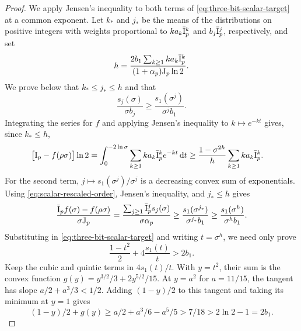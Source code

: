 \begin{proof}
We apply Jensen's inequality to both terms of \eqref{eq:three-bit-scalar-target}
at a common exponent. Let $k_*$ and $j_*$ be the means of the distributions
on positive integers with weights proportional to $k a_k\bar{\mathrm{I}}_p^k$ and $b_j\bar{\mathrm{I}}_p^j$,
respectively, and set
\begin{equation*}
 h=\frac{2b_1\sum_{k\ge1} k a_k\bar{\mathrm{I}}_p^k}{(1+\alpha_p)\mathrm{J}_p\ln2}.
\end{equation*}
We prove below that $k_*\le j_*\le h$ and that
\begin{equation}
 \label{eq:scalar-rescaled-order}
 \frac{s_j(\sigma)}{\sigma b_j}\ge
 \frac{s_1(\sigma^j)}{\sigma^j b_1}.
\end{equation}
Integrating the series for $f$ and applying Jensen's inequality
to $k\mapsto e^{-kt}$ gives, since $k_*\le h$,
\begin{align*}
 \bigl[\mathrm{I}_p-f(\rho\sigma)\bigr]\ln2
 &=\int_0^{-2\ln\sigma}\sum_{k\ge1} k a_k\bar{\mathrm{I}}_p^k e^{-kt}\,\mathrm dt
 \ge \frac{1-\sigma^{2h}}{h}\sum_{k\ge1} k a_k\bar{\mathrm{I}}_p^k .
\end{align*}
For the second term, $j\mapsto s_1(\sigma^j)/\sigma^j$ is a decreasing
convex sum of exponentials. Using \eqref{eq:scalar-rescaled-order},
Jensen's inequality, and $j_*\le h$ gives
\begin{equation*}
 \frac{\bar{\mathrm{I}}_p f(\sigma)-f(\rho\sigma)}{\sigma\mathrm{J}_p}
 =\frac{\sum_{j\ge1}\bar{\mathrm{I}}_p^j s_j(\sigma)}{\sigma\alpha_p}
 \ge \frac{s_1(\sigma^{j_*})}{\sigma^{j_*} b_1}
 \ge \frac{s_1(\sigma^h)}{\sigma^h b_1}.
\end{equation*}
Substituting in \eqref{eq:three-bit-scalar-target} and writing $t=\sigma^h$,
we need only prove
\begin{equation*}
 \frac{1-t^2}{2}+4\frac{s_1(t)}{t}>2b_1.
\end{equation*}
Keep the cubic and quintic terms in $4s_1(t)/t$. With $y=t^2$, their
sum is the convex function $g(y)=y^{3/2}/3+2y^{5/2}/15$.
At $y=a^2$ for $a=11/15$, the tangent has slope $a/2+a^3/3<1/2$.
Adding $(1-y)/2$ to this tangent and taking its minimum at $y=1$ gives
\begin{equation*}
 (1-y)/2+g(y)\ge a/2+a^3/6-a^5/5>7/18>2\ln2-1=2b_1 .
\end{equation*}


\end{proof}
